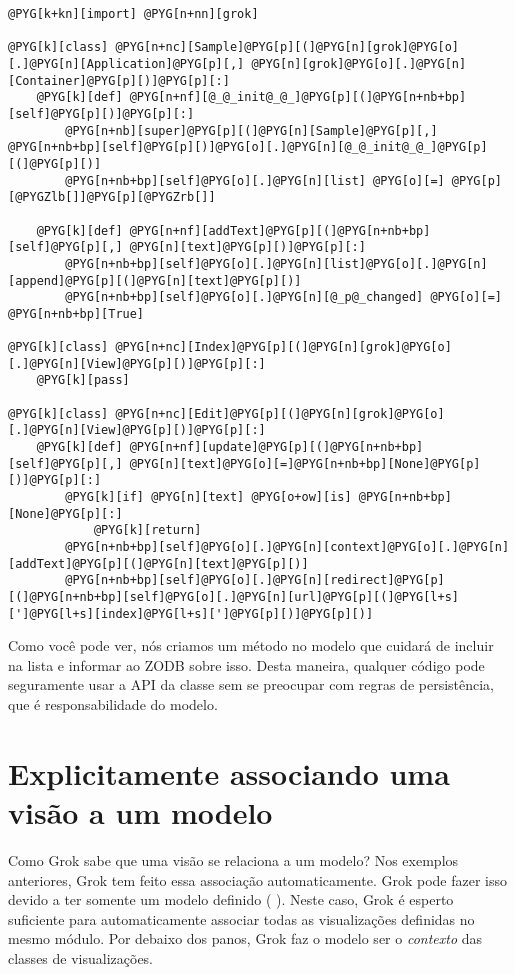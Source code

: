 \documentclass[a4paper,12pt,portuguese]{manual}
\begin{document}
\begin{Verbatim}[commandchars=@\[\]]
@PYG[k+kn][import] @PYG[n+nn][grok]

@PYG[k][class] @PYG[n+nc][Sample]@PYG[p][(]@PYG[n][grok]@PYG[o][.]@PYG[n][Application]@PYG[p][,] @PYG[n][grok]@PYG[o][.]@PYG[n][Container]@PYG[p][)]@PYG[p][:]
    @PYG[k][def] @PYG[n+nf][@_@_init@_@_]@PYG[p][(]@PYG[n+nb+bp][self]@PYG[p][)]@PYG[p][:]
        @PYG[n+nb][super]@PYG[p][(]@PYG[n][Sample]@PYG[p][,] @PYG[n+nb+bp][self]@PYG[p][)]@PYG[o][.]@PYG[n][@_@_init@_@_]@PYG[p][(]@PYG[p][)]
        @PYG[n+nb+bp][self]@PYG[o][.]@PYG[n][list] @PYG[o][=] @PYG[p][@PYGZlb[]]@PYG[p][@PYGZrb[]]

    @PYG[k][def] @PYG[n+nf][addText]@PYG[p][(]@PYG[n+nb+bp][self]@PYG[p][,] @PYG[n][text]@PYG[p][)]@PYG[p][:]
        @PYG[n+nb+bp][self]@PYG[o][.]@PYG[n][list]@PYG[o][.]@PYG[n][append]@PYG[p][(]@PYG[n][text]@PYG[p][)]
        @PYG[n+nb+bp][self]@PYG[o][.]@PYG[n][@_p@_changed] @PYG[o][=] @PYG[n+nb+bp][True]
        
@PYG[k][class] @PYG[n+nc][Index]@PYG[p][(]@PYG[n][grok]@PYG[o][.]@PYG[n][View]@PYG[p][)]@PYG[p][:]
    @PYG[k][pass]

@PYG[k][class] @PYG[n+nc][Edit]@PYG[p][(]@PYG[n][grok]@PYG[o][.]@PYG[n][View]@PYG[p][)]@PYG[p][:]
    @PYG[k][def] @PYG[n+nf][update]@PYG[p][(]@PYG[n+nb+bp][self]@PYG[p][,] @PYG[n][text]@PYG[o][=]@PYG[n+nb+bp][None]@PYG[p][)]@PYG[p][:]
        @PYG[k][if] @PYG[n][text] @PYG[o+ow][is] @PYG[n+nb+bp][None]@PYG[p][:]
            @PYG[k][return]
        @PYG[n+nb+bp][self]@PYG[o][.]@PYG[n][context]@PYG[o][.]@PYG[n][addText]@PYG[p][(]@PYG[n][text]@PYG[p][)]
        @PYG[n+nb+bp][self]@PYG[o][.]@PYG[n][redirect]@PYG[p][(]@PYG[n+nb+bp][self]@PYG[o][.]@PYG[n][url]@PYG[p][(]@PYG[l+s][']@PYG[l+s][index]@PYG[l+s][']@PYG[p][)]@PYG[p][)]
\end{Verbatim}

Como você pode ver, nós criamos um método  no modelo que
cuidará de incluir na lista e informar ao ZODB sobre isso. Desta
maneira, qualquer código pode seguramente usar a API da classe
 sem se preocupar com regras de persistência, que é
responsabilidade do modelo.


\section{Explicitamente associando uma visão a um modelo}

Como Grok sabe que uma visão se relaciona a um modelo? Nos
exemplos anteriores, Grok tem feito essa associação automaticamente.
Grok pode fazer isso devido a ter somente um modelo definido (
). Neste caso, Grok é esperto suficiente para
automaticamente associar todas as visualizações definidas no mesmo
módulo. Por debaixo dos panos, Grok faz o modelo ser o \emph{contexto}
das classes de visualizações.
\end{document}
